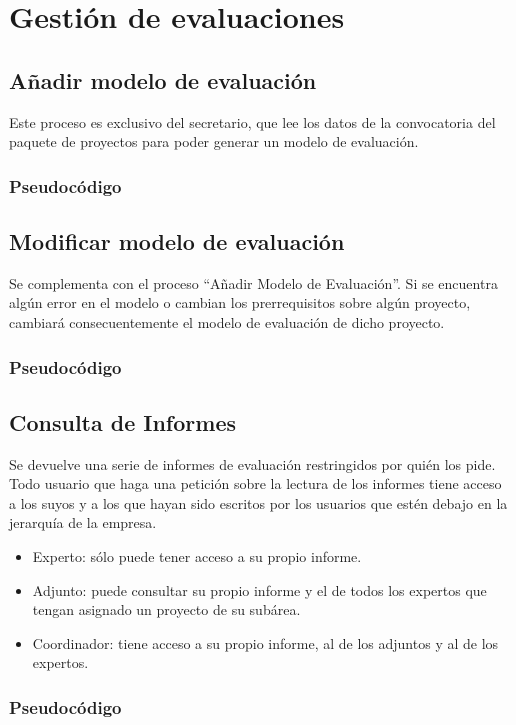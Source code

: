 \documentclass[12pt,a4paper,spanish,twoside]{book}
\begin{document}
\section{Gestión de evaluaciones}

\subsection{Añadir modelo de evaluación}
Este proceso es exclusivo del secretario, que lee los datos de la convocatoria 
del paquete de proyectos para poder generar un modelo de evaluación.

\subsubsection{Pseudocódigo}

\subsection{Modificar modelo de evaluación}
Se complementa con el proceso ``Añadir Modelo de Evaluación''. Si se encuentra 
algún error en el modelo o cambian los prerrequisitos sobre algún proyecto,  
cambiará consecuentemente el modelo de evaluación de dicho proyecto.

\subsubsection{Pseudocódigo}


\subsection{Consulta de Informes}
Se devuelve una serie de informes de evaluación restringidos por quién los pide.
Todo usuario que haga una petición sobre la lectura de los informes tiene 
acceso a los suyos y a los que hayan sido escritos por los usuarios que estén 
debajo en la jerarquía de la empresa.
\begin{itemize}
\item Experto: sólo puede tener acceso a su propio informe.
\item Adjunto: puede consultar su propio informe y el de todos los expertos que 
tengan asignado un proyecto de su subárea.
\item Coordinador: tiene acceso a su propio informe, al de los adjuntos y al de 
los expertos.
\end{itemize}

\subsubsection{Pseudocódigo}
\end{document}
